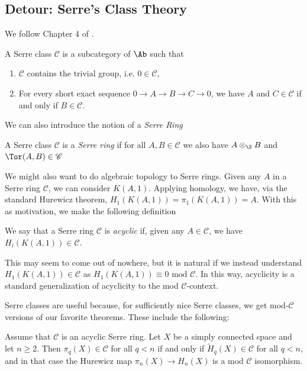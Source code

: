 \subsection{Detour: Serre's Class Theory}
We follow Chapter 4 of \cite{millerLecturesAlgebraicTopology2021}. 
\begin{definition}
    A Serre class $\mathscr C$ is a subcategory of $\Ab$ such that
    \begin{enumerate}
        \item $\mathscr C$ contains the trivial group, i.e. $0\in \mathscr C$,
        \item For every short exact sequence $0\to A\to B\to C\to 0$, we have $A$ and $C\in \mathscr C$ if and only if $B\in \mathscr C$.
    \end{enumerate}
\end{definition}
    We can also introduce the notion of a \textit{Serre Ring}
\begin{definition}
    A Serre class $\mathscr C$ is a \textit{Serre ring} if for all $A,B\in \mathscr C$ we also have $A\otimes_\Z B$ and $\Tor(A,B)\in \mathscr C$
\end{definition}
We might also want to do algebraic topology to Serre rings. Given any $A$ in a Serre ring $\mathscr C$, we can consider $K(A,1)$. Applying homology, we have, via the standard Hurewicz theorem, $H_1(K(A,1))=\pi_1(K(A,1))=A$. With this as motivation, we make the following definition
\begin{definition}
    We say that a Serre ring $\mathscr C$ is \textit{acyclic} if, given any $A\in \mathscr C$, we have $H_i(K(A,1))\in\mathscr C$. 
\end{definition}
This may seem to come out of nowhere, but it is natural if we instead understand $H_1(K(A,1))\in \mathscr C$ as $H_1(K(A,1))\equiv 0\text{ mod }\mathscr C$. In this way, acyclicity is a standard generalization of acyclicity to the mod $\mathscr C$-context.

Serre classes are useful because, for sufficiently nice Serre classes, we get mod-$\mathscr C$ versions of our favorite theorems. These include the following:
\begin{theorem}
    Assume that $\mathscr{C}$ is an acyclic Serre ring. Let $X$ be a simply connected space and let $n \geq 2$. Then $\pi_q(X) \in \mathscr{C}$ for all $q < n$ if and only if $\widetilde{H}_q(X) \in \mathscr{C}$ for all $q < n$, and in that case the Hurewicz map $\pi_n(X) \to H_n(X)$ is a mod $\mathscr{C}$ isomorphism.
\end{theorem}


